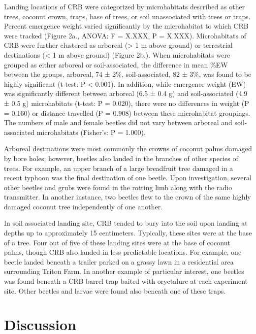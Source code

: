 \documentclass[11pt,letterpaper]{scrartcl}
\begin{document}
Landing locations of CRB were categorized by microhabitats described as other trees, coconut crown, traps, base of trees, or soil unassociated with trees or traps. Percent emergence weight varied significantly by the microhabitat to which CRB were tracked (Figure 2a., ANOVA: F = X.XXX, P = X.XXX). Microhabitats of CRB were further clustered as arboreal (> 1 m above ground) or terrestrial destinations (< 1 m above ground) (Figure 2b.).  When microhabitats were grouped as either arboreal or soil-associated, the difference in mean \%EW between the groups, arboreal, 74 ± 2\%, soil-associated, 82 ± 3\%, was found to be highly significant (t-test: P < 0.001).   In addition, while emergence weight (EW) was significantly different between arboreal (6.5 ± 0.4 g) and soil-associated (4.9 ± 0.5 g) microhabitats (t-test: P = 0.020), there were no differences in weight (P = 0.160) or distance travelled (P = 0.908) between these microhabitat groupings.  The numbers of male and female beetles did not vary between arboreal and soil-associated microhabitats (Fisher’s: P = 1.000).

Arboreal destinations were most commonly the crowns of coconut palms damaged by bore holes; however, beetles also landed in the branches of other species of trees. For example, an upper branch of a large breadfruit tree damaged in a recent typhoon was the final destination of one beetle. Upon investigation, several other beetles and grubs were found in the rotting limb along with the radio transmitter. In another instance, two beetles flew to the crown of the same highly damaged coconut tree independently of one another. 

In soil associated landing site, CRB tended to bury into the soil upon landing at depths up to approximately 15 centimeters. Typically, these sites were at the base of a tree. Four out of five of these landing sites were at the base of coconut palms, though CRB also landed in less predictable locations. For example, one beetle landed beneath a trailer parked on a grassy lawn in a residential area surrounding Triton Farm. In another example of particular interest, one beetles was found beneath a CRB barrel trap baited with oryctalure at each experiment site. Other beetles and larvae were found also beneath one of these traps. 

\section*{Discussion}
\end{document}
